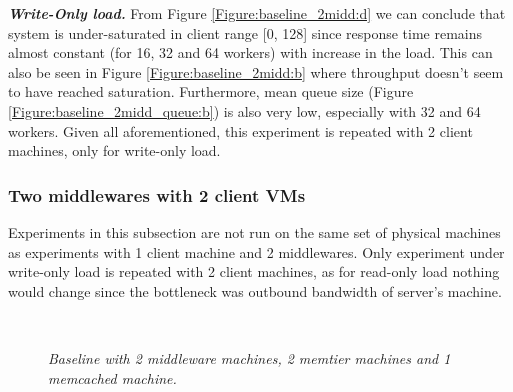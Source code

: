 \documentclass[11pt,a4paper]{article}
\begin{document}
\textbf{\textit{Write-Only load.}} From Figure \ref{Figure:baseline_2midd:d} we can conclude that system is under-saturated in client range [0, 128] since response time remains almost constant (for 16, 32 and 64 workers) with increase in the load. This can also be seen in Figure \ref{Figure:baseline_2midd:b} where throughput doesn't seem to have reached saturation. Furthermore, mean queue size (Figure \ref{Figure:baseline_2midd_queue:b}) is also very low, especially with 32 and 64 workers. Given all aforementioned, this experiment is repeated with 2 client machines, only for write-only load. 

\subsubsection{Two middlewares with 2 client VMs}

Experiments in this subsection are not run on the same set of physical machines as experiments with 1 client machine and 2 middlewares. Only experiment under write-only load is repeated with 2 client machines, as for read-only load nothing would change since the bottleneck was outbound bandwidth of server's machine.

\begin{figure}[ht!]
	\centering	
	\hfill
	\\
	\caption{\textit{Baseline with 2 middleware machines, 2 memtier machines and 1 memcached machine.}}
	\label{Figure:baseline_2midd_2vms}	
\end{figure}
\end{document}
